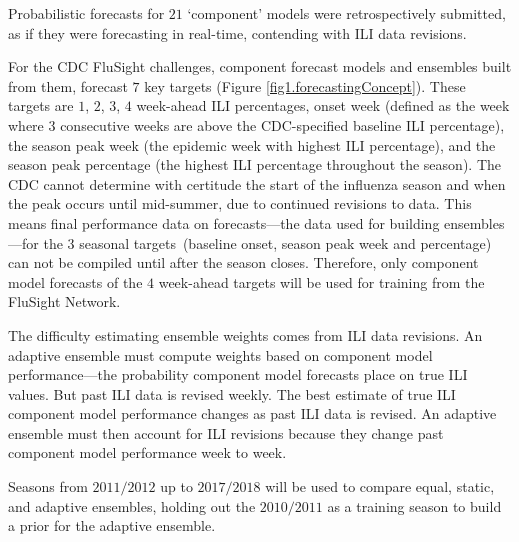 \documentclass[12pt]{article}
\def\ngr#1{{\small\color{Red}\textbf{[ngr: #1]}}}
\begin{document}
Probabilistic forecasts for $21$ `component' models were retrospectively submitted, as if they were forecasting in real-time, contending with ILI data revisions.

For the CDC FluSight challenges, component forecast models and ensembles built from them, forecast $7$ key targets (Figure \ref{fig1.forecastingConcept}). These targets are $1$, $2$, $3$, $4$ week-ahead ILI percentages, onset week (defined as the week where $3$ consecutive weeks are above the CDC-specified baseline ILI percentage), the season peak week (the epidemic week with highest ILI percentage), and the season peak percentage (the highest ILI percentage throughout the season).
The CDC cannot determine with certitude the start of the influenza season and when the peak occurs until mid-summer, due to continued revisions to data.
This means final performance data on forecasts---the data used for building ensembles---for the $3$ seasonal targets~(baseline onset, season peak week and percentage) can not be compiled until after the season closes.
Therefore, only component model forecasts of the $4$ week-ahead targets will be used for training from the FluSight Network.

The difficulty estimating ensemble weights comes from ILI data revisions.
An adaptive ensemble must compute weights based on component model performance---the probability component model forecasts place on true ILI values.
But past ILI data is revised weekly.
The best estimate of true ILI component model performance changes as past ILI data is revised. 
An adaptive ensemble must then account for ILI revisions because they change past component model performance week to week.

Seasons from $2011/2012$ up to $2017/2018$ will be used to compare equal, static, and adaptive ensembles, holding out the $2010/2011$ as a training season to build a prior for the adaptive ensemble.
\end{document}
